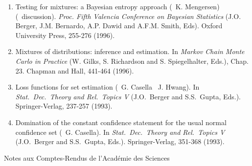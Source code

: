 \begin{enumerate}
\item Testing for mixtures: a Bayesian entropy approach 
(\avec\  K. Mengersen) (\avec\ discussion). 
{\it  Proc. Fifth Valencia Conference on Bayesian Statistics}
(J.O. Berger, J.M. Bernardo, A.P. Dawid and A.F.M. Smith, Eds). Oxford
University Press, 255-276 (1996).

\item Mixtures of distributions: inference and estimation.
In {\it Markov Chain Monte Carlo in Practice}
(W. Gilks, S. Richardson and S. Spiegelhalter, Eds.), Chap. 23. 
Chapman and Hall, 441-464 (1996).

\item Loss functions for set estimation (\avec\  G. Casella \et\ J. Hwang). 
In {\it Stat.\ Dec.\ Theory and Rel.\ Topics V} (J.O.\ Berger and S.S.\ 
Gupta, Eds.). Springer-Verlag, 237-257 (1993).
 
\item Domination of the constant confidence statement for the usual
normal confidence set (\avec\  G. Casella). 
In {\it Stat.\ Dec.\ Theory and Rel.\ Topics V} (J.O.\ Berger and S.S.\ 
Gupta, Eds.). Springer-Verlag, 351-368 (1993).
\end{enumerate}

\bigskip
                \centerline{\sc Notes aux Comptes-Rendus de l'Académie des Sciences}

